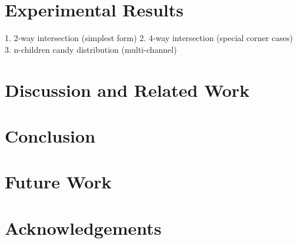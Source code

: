 \documentclass[conference]{IEEEtran}
\begin{document}
\section{Experimental Results}



1. 2-way intersection (simplest form)
2. 4-way intersection (special corner cases)
3. n-children candy distribution (multi-channel)


\section{Discussion and Related Work}




\section{Conclusion}


\section{Future Work}


\section{Acknowledgements}
\end{document}

